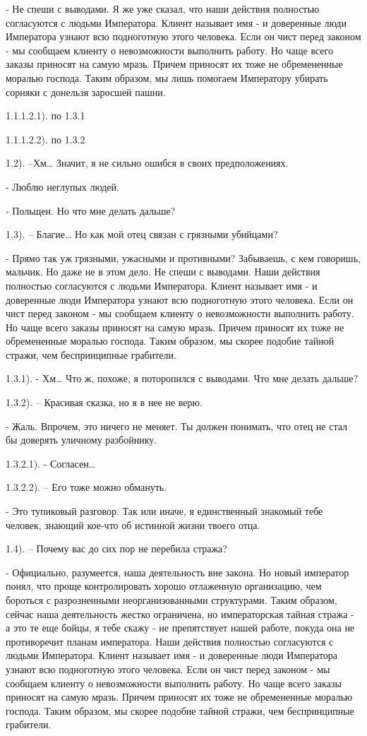 \documentclass[12pt,a4paper]{book}
\begin{document}
- Не спеши с выводами. Я же уже сказал, что наши действия полностью согласуются с людьми Императора. Клиент называет имя - и доверенные люди Императора узнают всю подноготную этого человека. Если он чист перед законом - мы сообщаем клиенту о невозможности выполнить работу. Но чаще всего заказы приносят на самую мразь. Причем приносят их тоже не обремененные моралью господа. Таким образом, мы лишь помогаем Императору убирать сорняки с донельзя заросшей пашни.

1.1.1.2.1). по 1.3.1

1.1.1.2.2). по 1.3.2

1.2). –Хм… Значит, я не сильно ошибся в своих предположениях.

- Люблю неглупых людей.

- Польщен. Но что мне делать дальше?

1.3). – Благие… Но как мой отец связан с грязными убийцами?

- Прямо так уж грязными, ужасными и противными? Забываешь, с кем говоришь, мальчик. Но даже не в этом дело. Не спеши с выводами. Наши действия полностью согласуются с людьми Императора. Клиент называет имя - и доверенные люди Императора узнают всю подноготную этого человека. Если он чист перед законом - мы сообщаем клиенту о невозможности выполнить работу. Но чаще всего заказы приносят на самую мразь. Причем приносят их тоже не обремененные моралью господа. Таким образом, мы скорее подобие тайной стражи, чем беспринципные грабители.

1.3.1). - Хм… Что ж, похоже, я поторопился с выводами. Что мне делать дальше?

1.3.2). – Красивая сказка, но я в нее не верю.

- Жаль. Впрочем, это ничего не меняет. Ты должен понимать, что отец не стал бы доверять уличному разбойнику.

1.3.2.1). - Согласен…

1.3.2.2). – Его тоже можно обмануть.

- Это тупиковый разговор. Так или иначе, я единственный знакомый тебе человек, знающий кое-что об истинной жизни твоего отца.

1.4). – Почему вас до сих пор не перебила стража?

- Официально, разумеется, наша деятельность вне закона. Но новый император понял, что проще контролировать хорошо отлаженную организацию, чем бороться с разрозненными неорганизованными структурами. Таким образом, сейчас наша деятельность жестко ограничена, но императорская тайная стража - а это те еще бойцы, я тебе скажу - не препятствует нашей работе, покуда она не противоречит планам императора. Наши действия полностью согласуются с людьми Императора. Клиент называет имя - и доверенные люди Императора узнают всю подноготную этого человека. Если он чист перед законом - мы сообщаем клиенту о невозможности выполнить работу. Но чаще всего заказы приносят на самую мразь. Причем приносят их тоже не обремененные моралью господа. Таким образом, мы скорее подобие тайной стражи, чем беспринципные грабители.
\end{document}
